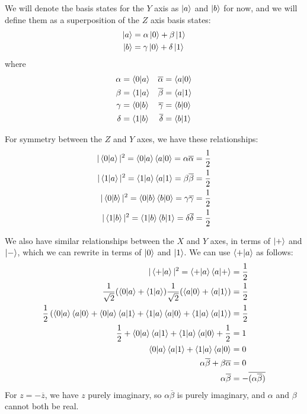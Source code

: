 \documentclass[12pt]{extarticle}
\begin{document}
We will denote the basis states for the $Y$ axis as $\ket{a}$ and $\ket{b}$ for now,
and we will define them as a superposition of the $Z$ axis basis states:
\begin{align*}
\ket{a} & = \alpha\ket{0} + \beta\ket{1} \\
\ket{b} & = \gamma\ket{0} + \delta\ket{1}
\end{align*}
where
\begin{align*}
\alpha & = \innerproduct{0}{a} & \overline{\alpha} & = \innerproduct{a}{0} \\
\beta & = \innerproduct{1}{a} & \overline{\beta} & = \innerproduct{a}{1} \\
\gamma & = \innerproduct{0}{b} & \overline{\gamma} & = \innerproduct{b}{0} \\
\delta & = \innerproduct{1}{b} & \overline{\delta} & = \innerproduct{b}{1}
\end{align*}

For symmetry between the $Z$ and $Y$ axes, we have these relationships:
\begin{align*}
|\innerproduct{0}{a}|^2 = \innerproduct{0}{a}\innerproduct{a}{0} = \alpha\overline{\alpha} & = \frac{1}{2} \\
|\innerproduct{1}{a}|^2 = \innerproduct{1}{a}\innerproduct{a}{1} = \beta\overline{\beta} & = \frac{1}{2} \\
|\innerproduct{0}{b}|^2 = \innerproduct{0}{b}\innerproduct{b}{0} = \gamma\overline{\gamma} & = \frac{1}{2} \\
|\innerproduct{1}{b}|^2 = \innerproduct{1}{b}\innerproduct{b}{1} = \delta\overline{\delta} & = \frac{1}{2}
\end{align*}

We also have similar relationships between the $X$ and $Y$ axes, in terms of $\ket{+}$ and $\ket{-}$,
which we can rewrite in terms of $\ket{0}$ and $\ket{1}$.
We can use $\innerproduct{+}{a}$ as follows:
\begin{align*}
|\innerproduct{+}{a}|^2 = \innerproduct{+}{a}\innerproduct{a}{+} & = \frac{1}{2} \\
\istwo(\innerproduct{0}{a} + \innerproduct{1}{a})\istwo(\innerproduct{a}{0} + \innerproduct{a}{1}) & = \frac{1}{2} \\
\frac{1}{2}\left(\innerproduct{0}{a}\innerproduct{a}{0} + \innerproduct{0}{a}\innerproduct{a}{1} + \innerproduct{1}{a}\innerproduct{a}{0} + \innerproduct{1}{a}\innerproduct{a}{1}\right) & = \frac{1}{2} \\
\frac{1}{2} + \innerproduct{0}{a}\innerproduct{a}{1} + \innerproduct{1}{a}\innerproduct{a}{0} + \frac{1}{2} & = 1 \\
\innerproduct{0}{a}\innerproduct{a}{1} + \innerproduct{1}{a}\innerproduct{a}{0} & = 0 \\
\alpha\overline{\beta} + \beta\overline{\alpha} & = 0 \\
\alpha\overline{\beta} & = -\overline{(\alpha\overline{\beta})}
\end{align*}
For $z=-\overline{z}$, we have $z$ purely imaginary, so $\alpha\overline{\beta}$ is purely imaginary,
and $\alpha$ and $\beta$ cannot both be real.
\end{document}
